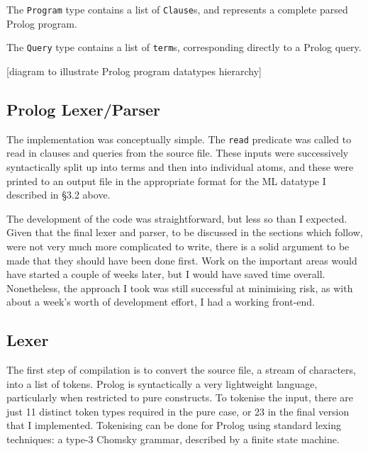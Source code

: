 \documentclass[12pt]{article}
\begin{document}
The \verb|Program| type contains a list of \verb|Clause|s, and represents a complete parsed Prolog program.

The \verb|Query| type contains a list of \verb|term|s, corresponding directly to a Prolog query.

[diagram to illustrate Prolog program datatypes hierarchy]

\subsection{Prolog Lexer/Parser}

The implementation was conceptually simple. 
The \verb|read| predicate was called to read in clauses and queries from the source file. 
These inputs were successively syntactically split up into terms and then into individual atoms, and these were printed to an output file in the appropriate format for the ML datatype I described in \S3.2 above.

The development of the code was straightforward, but less so than I expected. 
Given that the final lexer and parser, to be discussed in the sections which follow, were not very much more complicated to write, there is a solid argument to be made that they should have been done first.
Work on the important areas would have started a couple of weeks later, but I would have saved time overall.
Nonetheless, the approach I took was still successful at minimising risk, as with about a week's worth of development effort, I had a working front-end.

\subsection{Lexer}

The first step of compilation is to convert the source file, a stream of characters, into a list of tokens. 
Prolog is syntactically a very lightweight language, particularly when restricted to pure constructs. 
To tokenise the input, there are just 11 distinct token types required in the pure case, or 23 in the final version that I implemented. 
Tokenising can be done for Prolog using standard lexing techniques: a type-3 Chomsky grammar, described by a finite state machine. 

\newpage
\end{document}
